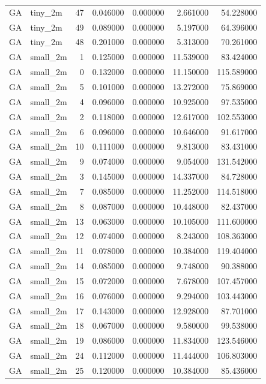 \begin{tabular}{llrrrrr}
GA & tiny_2m & 47 & 0.046000 & 0.000000 & 2.661000 & 54.228000 \\
GA & tiny_2m & 49 & 0.089000 & 0.000000 & 5.197000 & 64.396000 \\
GA & tiny_2m & 48 & 0.201000 & 0.000000 & 5.313000 & 70.261000 \\
GA & small_2m & 1 & 0.125000 & 0.000000 & 11.539000 & 83.424000 \\
GA & small_2m & 0 & 0.132000 & 0.000000 & 11.150000 & 115.589000 \\
GA & small_2m & 5 & 0.101000 & 0.000000 & 13.272000 & 75.869000 \\
GA & small_2m & 4 & 0.096000 & 0.000000 & 10.925000 & 97.535000 \\
GA & small_2m & 2 & 0.118000 & 0.000000 & 12.617000 & 102.553000 \\
GA & small_2m & 6 & 0.096000 & 0.000000 & 10.646000 & 91.617000 \\
GA & small_2m & 10 & 0.111000 & 0.000000 & 9.813000 & 83.431000 \\
GA & small_2m & 9 & 0.074000 & 0.000000 & 9.054000 & 131.542000 \\
GA & small_2m & 3 & 0.145000 & 0.000000 & 14.337000 & 84.728000 \\
GA & small_2m & 7 & 0.085000 & 0.000000 & 11.252000 & 114.518000 \\
GA & small_2m & 8 & 0.087000 & 0.000000 & 10.448000 & 82.437000 \\
GA & small_2m & 13 & 0.063000 & 0.000000 & 10.105000 & 111.600000 \\
GA & small_2m & 12 & 0.074000 & 0.000000 & 8.243000 & 108.363000 \\
GA & small_2m & 11 & 0.078000 & 0.000000 & 10.384000 & 119.404000 \\
GA & small_2m & 14 & 0.085000 & 0.000000 & 9.748000 & 90.388000 \\
GA & small_2m & 15 & 0.072000 & 0.000000 & 7.678000 & 107.457000 \\
GA & small_2m & 16 & 0.076000 & 0.000000 & 9.294000 & 103.443000 \\
GA & small_2m & 17 & 0.143000 & 0.000000 & 12.928000 & 87.701000 \\
GA & small_2m & 18 & 0.067000 & 0.000000 & 9.580000 & 99.538000 \\
GA & small_2m & 19 & 0.086000 & 0.000000 & 11.834000 & 123.546000 \\
GA & small_2m & 24 & 0.112000 & 0.000000 & 11.444000 & 106.803000 \\
GA & small_2m & 25 & 0.120000 & 0.000000 & 10.384000 & 85.436000 \\

\end{tabular}
